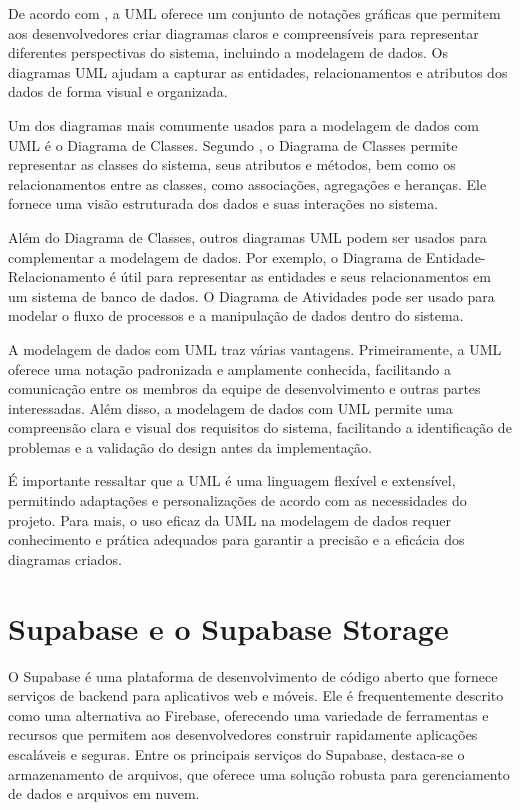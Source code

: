 De acordo com \cite{rumbaugh2004unified}, a UML oferece um
conjunto de notações gráficas que permitem aos desenvolvedores criar diagramas claros e
compreensíveis para representar diferentes perspectivas do sistema, incluindo a modelagem de
dados. Os diagramas UML ajudam a capturar as entidades, relacionamentos e atributos dos dados
de forma visual e organizada.

Um dos diagramas mais comumente usados para a modelagem de dados com UML é o
Diagrama de Classes. Segundo \cite{Larman2004}, o Diagrama de Classes permite representar
as classes do sistema, seus atributos e métodos, bem como os relacionamentos entre as classes,
como associações, agregações e heranças. Ele fornece uma visão estruturada dos dados e suas
interações no sistema.

Além do Diagrama de Classes, outros diagramas UML podem ser usados para complementar a modelagem de dados. Por exemplo, o Diagrama de Entidade-Relacionamento é útil para
representar as entidades e seus relacionamentos em um sistema de banco de dados. O Diagrama
de Atividades pode ser usado para modelar o fluxo de processos e a manipulação de dados dentro
do sistema.

A modelagem de dados com UML traz várias vantagens. Primeiramente, a UML oferece
uma notação padronizada e amplamente conhecida, facilitando a comunicação entre os membros
da equipe de desenvolvimento e outras partes interessadas. Além disso, a modelagem de dados
com UML permite uma compreensão clara e visual dos requisitos do sistema, facilitando a
identificação de problemas e a validação do design antes da implementação.

É importante ressaltar que a UML é uma linguagem flexível e extensível, permitindo
adaptações e personalizações de acordo com as necessidades do projeto. Para mais, o uso eficaz
da UML na modelagem de dados requer conhecimento e prática adequados para garantir a
precisão e a eficácia dos diagramas criados.


\section*{Supabase e o Supabase Storage}

O Supabase é uma plataforma de desenvolvimento de código aberto que fornece serviços
de backend para aplicativos web e móveis. Ele é frequentemente descrito como uma alternativa ao
Firebase, oferecendo uma variedade de ferramentas e recursos que permitem aos desenvolvedores
construir rapidamente aplicações escaláveis e seguras. Entre os principais serviços do Supabase,
destaca-se o armazenamento de arquivos, que oferece uma solução robusta para gerenciamento
de dados e arquivos em nuvem.

